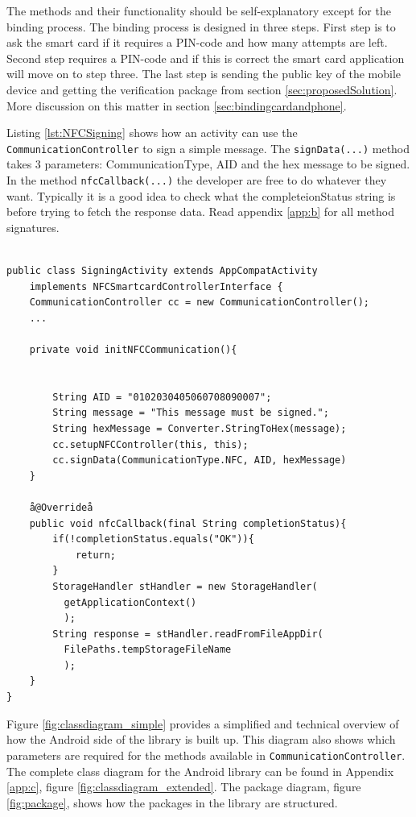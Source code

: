 The methods and their functionality should be self-explanatory except for the binding process. The binding process is designed in three steps. First step is to ask the smart card if it requires a PIN-code and how many attempts are left. Second step requires a PIN-code and if this is correct the smart card application will move on to step three. The last step is sending the public key of the mobile device and getting the verification package from section \ref{sec:proposedSolution}. More discussion on this matter in section \ref{sec:bindingcardandphone}.

Listing \ref{lst:NFCSigning} shows how an activity can use the \texttt{CommunicationController} to sign a simple message. The \texttt{signData(...)} method takes 3 parameters: CommunicationType, AID and the hex message to be signed. In the method \texttt{nfcCallback(...)} the developer are free to do whatever they want. Typically it is a good idea to check what the completeionStatus string is before trying to fetch the response data. Read appendix \ref{app:b} for all method signatures.

\begin{lstlisting}[caption=Java code example showing how to send sign a message using a NFC smart card., label=lst:NFCSigning,escapechar=å]

public class SigningActivity extends AppCompatActivity
    implements NFCSmartcardControllerInterface {
    CommunicationController cc = new CommunicationController();
    ...

    private void initNFCCommunication(){


        String AID = "0102030405060708090007";
        String message = "This message must be signed.";
        String hexMessage = Converter.StringToHex(message);
        cc.setupNFCController(this, this);
        cc.signData(CommunicationType.NFC, AID, hexMessage)
    }

    å@Overrideå
    public void nfcCallback(final String completionStatus){
        if(!completionStatus.equals("OK")){
            return;
        }
        StorageHandler stHandler = new StorageHandler(
          getApplicationContext()
          );
        String response = stHandler.readFromFileAppDir(
          FilePaths.tempStorageFileName
          );
    }
}

\end{lstlisting}


Figure \ref{fig:classdiagram_simple} provides a simplified and technical overview of how the Android side of the library is built up. This diagram also shows which parameters are required for the methods available in \texttt{CommunicationController}. The complete class diagram for the Android library can be found in Appendix \ref{app:c}, figure \ref{fig:classdiagram_extended}. The package diagram, figure \ref{fig:package}, shows how  the packages in the library are structured.

